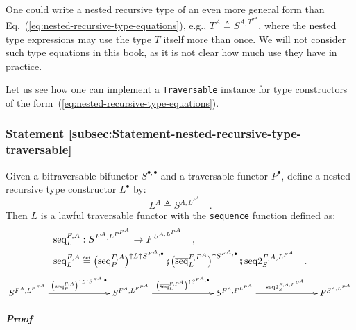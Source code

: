 One could write a nested recursive type of an even more general form
than Eq.~(\ref{eq:nested-recursive-type-equations}), e.g., $T^{A}\triangleq S^{A,T^{T^{A}}}$,
where the nested type expressions may use the type $T$ itself more
than once. We will not consider such type equations in this book,
as it is not clear how much use they have in practice.

Let us see how one can implement a \lstinline!Traversable! instance
for type constructors of the form~(\ref{eq:nested-recursive-type-equations}).

\subsubsection{Statement \label{subsec:Statement-nested-recursive-type-traversable}\ref{subsec:Statement-nested-recursive-type-traversable}}

Given a bitraversable bifunctor $S^{\bullet,\bullet}$ and a traversable
functor $P^{\bullet}$, define a nested recursive type constructor
$L^{\bullet}$ by:
\[
L^{A}\triangleq S^{A,L^{P^{A}}}\quad.
\]
Then $L$ is a lawful traversable functor with the \lstinline!sequence!
function defined as:
\begin{align*}
 & \text{seq}_{L}^{F,A}:S^{F^{A},L^{P^{F^{A}}}}\rightarrow F^{S^{A,L^{P^{A}}}}\quad,\\
 & \text{seq}_{L}^{F,A}\triangleq\big(\text{seq}_{P}^{F,A}\big)^{\uparrow L\uparrow S^{F^{A},\bullet}}\bef\big(\overline{\text{seq}}_{L}^{F,P^{A}}\big)^{\uparrow S^{F^{A},\bullet}}\bef\text{seq2}_{S}^{F,A,L^{P^{A}}}\quad.
\end{align*}
\[
\xymatrix{\xyScaleY{1.4pc}\xyScaleX{6pc}S^{F^{A},L^{P^{F^{A}}}}\ar[r]\sp(0.5){\big(\text{seq}_{P}^{F,A}\big)^{\uparrow L\uparrow S^{F^{A},\bullet}}} & S^{F^{A},L^{F^{P^{A}}}}\ar[r]\sp(0.5){\big(\overline{\text{seq}}_{L}^{F,P^{A}}\big)^{\uparrow S^{F^{A},\bullet}}} & S^{F^{A},F^{L^{P^{A}}}}\ar[r]\sp(0.5){\text{seq2}_{S}^{F,A,L^{P^{A}}}} & F^{S^{A,L^{P^{A}}}}}
\]


\subparagraph{Proof}

